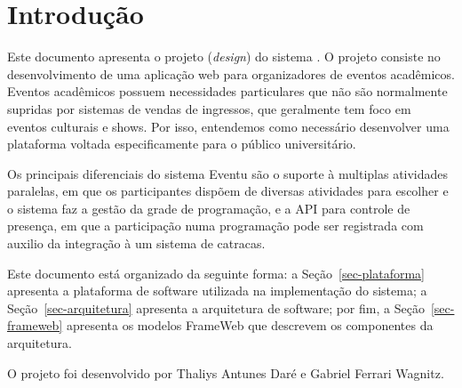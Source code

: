 \chapter{Introdução}
\label{sec-intro}
\vspace{-1cm}

Este documento apresenta o projeto (\textit{design}) do sistema \emph{\imprimirtitulo}. 
O projeto consiste no desenvolvimento de uma aplicação web para organizadores de eventos acadêmicos. Eventos acadêmicos possuem necessidades particulares que não são normalmente supridas por sistemas de vendas de ingressos, que geralmente tem foco em eventos culturais e shows. Por isso, entendemos como necessário desenvolver uma plataforma voltada especificamente para o público universitário.

Os principais diferenciais do sistema Eventu são o suporte à multiplas atividades paralelas, em que os participantes dispõem de diversas atividades para escolher e o sistema faz a gestão da grade de programação, e a API para controle de presença, em que a participação numa programação pode ser registrada com auxilio da integração à um sistema de catracas.

Este documento está organizado da seguinte forma: 
a Seção~\ref{sec-plataforma} apresenta a plataforma de software utilizada na implementação do sistema;
a Seção~\ref{sec-arquitetura} apresenta a arquitetura de software; por fim, 
a Seção~\ref{sec-frameweb} apresenta os modelos FrameWeb que descrevem os componentes da arquitetura.

O projeto foi desenvolvido por Thaliys Antunes Daré e Gabriel Ferrari Wagnitz.

